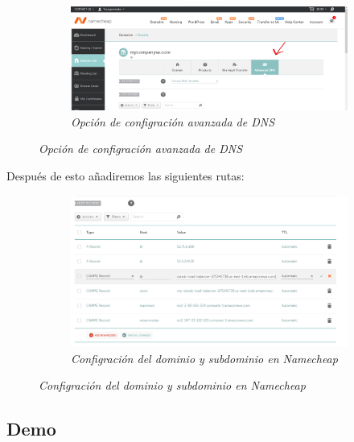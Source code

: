 \begin{figure}[H]
    \centering
    \begin{subfigure}[b]{0.8\textwidth}
        \centering
        \includegraphics[width=\textwidth]{Figures/0. General/advanced_config_selection.png}
        \caption{\textit{Opción de configración avanzada de DNS}}
        \label{fig: advanced dns configuration}
    \end{subfigure}
\end{figure}

Después de esto añadiremos las siguientes rutas:

\begin{figure}[H]
    \centering
    \begin{subfigure}[b]{0.8\textwidth}
        \centering
        \includegraphics[width=\textwidth]{Figures/0. General/domain_config.png}
        \caption{\textit{Configración del dominio y subdominio en Namecheap}}
        \label{fig: domain configuration}
    \end{subfigure}
\end{figure}



\subsection{Demo}